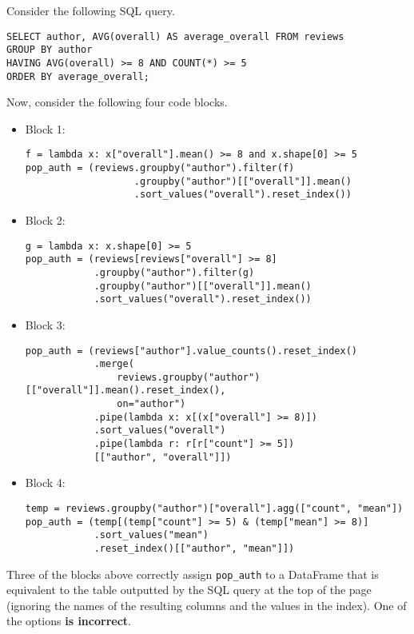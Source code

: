 \documentclass[twoside,12pt]{article}
\begin{document}
\begin{probset}
\begin{prob}[(10 pts)]
\begin{prob}[(4 pts)]
Consider the following SQL query.

\begin{verbatim}
SELECT author, AVG(overall) AS average_overall FROM reviews
GROUP BY author
HAVING AVG(overall) >= 8 AND COUNT(*) >= 5
ORDER BY average_overall;
\end{verbatim}

Now, consider the following four code blocks.

\begin{itemize}
    \item Block 1:
\begin{verbatim}
f = lambda x: x["overall"].mean() >= 8 and x.shape[0] >= 5
pop_auth = (reviews.groupby("author").filter(f)
                   .groupby("author")[["overall"]].mean()
                   .sort_values("overall").reset_index())
\end{verbatim}

    \item Block 2:
\begin{verbatim}
g = lambda x: x.shape[0] >= 5
pop_auth = (reviews[reviews["overall"] >= 8]
            .groupby("author").filter(g)
            .groupby("author")[["overall"]].mean()
            .sort_values("overall").reset_index())
\end{verbatim}
    \item Block 3:
\begin{verbatim}
pop_auth = (reviews["author"].value_counts().reset_index()
            .merge(
                reviews.groupby("author")[["overall"]].mean().reset_index(), 
                on="author")
            .pipe(lambda x: x[(x["overall"] >= 8)])
            .sort_values("overall")
            .pipe(lambda r: r[r["count"] >= 5])
            [["author", "overall"]])
\end{verbatim}

    \item Block 4:
\begin{verbatim}
temp = reviews.groupby("author")["overall"].agg(["count", "mean"])
pop_auth = (temp[(temp["count"] >= 5) & (temp["mean"] >= 8)]
            .sort_values("mean")
            .reset_index()[["author", "mean"]])
\end{verbatim}

\end{itemize}

Three of the blocks above correctly assign \texttt{pop\_auth} to a DataFrame that is equivalent to the table outputted by the SQL query at the top of the page (ignoring the names of the resulting columns and the values in the index). One of the options \textbf{is incorrect}.


\end{prob}
\end{prob}
\end{probset}
\end{document}
